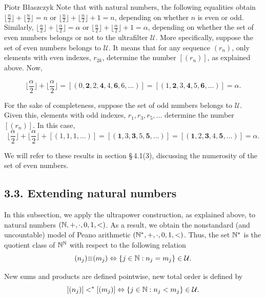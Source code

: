 \begin{artengenv}{Piotr Błaszczyk}
Note that with natural numbers, the following equalities obtain $\lfloor \frac n2 \rfloor + \lfloor \frac n2 \rfloor=n$ or
$\lfloor \frac n2 \rfloor + \lfloor \frac n2 \rfloor +1=n$,
 depending on whether $n$ is even or odd. Similarly, $\Big\lfloor \frac\alpha 2 \Big\rfloor +\Big\lfloor \frac\alpha 2 \Big\rfloor=\alpha$ or $\Big\lfloor \frac\alpha 2 \Big\rfloor +\Big\lfloor \frac\alpha 2 \Big\rfloor+1=\alpha$, depending on whether the set of even numbers belongs or not  to the ultrafilter $\mathcal U$. More specifically,
suppose the set of even numbers belongs to $\mathcal U$. It means that for any sequence $(r_n)$, only elements with 
even indexes, $r_{2k}$, determine the number $[(r_n)]$, as explained above. Now,
 
 \[\Big\lfloor \frac\alpha 2 \Big\rfloor +\Big\lfloor \frac\alpha 2 \Big\rfloor=[(0,\textbf{2},2,\textbf{4},4,\textbf{6},6,... )]=[(1,\textbf{2},3,\textbf{4},5,\textbf{6},...)]=\alpha.\]
 
  
 

For the sake of completeness, suppose the set of odd numbers belongs to $\mathcal U$. Given this, elements with odd indexes, $r_1, r_3, r_5,...$ determine the number $[(r_n)]$. In this case,
 \[\Big\lfloor \frac\alpha 2 \Big\rfloor +\Big\lfloor \frac\alpha 2 \Big\rfloor+[(1,1,1,...)]=
 [(\textbf{1},3,\textbf{3},5,\textbf{5},...)]=[(\textbf{1},2,\textbf{3},4,\textbf{5},...)]=\alpha.  \]
 
 We will refer to these results in section \S\,4.1(3), discussing the numerosity of the set of even numbers.

\subsection{3.3. Extending natural numbers}
In this subsection, we apply the ultrapower construction, as explained above, to natural numbers $({\mathbb{N}},+,\cdot,0,1,<)$. As a result, we obtain the nonstandard (and uncountable) model of Peano arithmetic $({\mathbb{N}}^*,+,\cdot,0,1,<)$. Thus, the set ${\mathbb{N}}^*$  is  the quotient class of ${\mathbb{N}}^{{\mathbb{N}}}$ with
 respect to the  following relation
\[(n_j)\mathcal \equiv (m_j) \Leftrightarrow \{j\in{\mathbb{N}}: n_j=m_j\}\in \mathcal U.\]

New sums and products are defined pointwise,
 new total order is defined by
\[[(n_j)]<^*[(m_j)]\Leftrightarrow \{j\in{\mathbb{N}}: n_j<m_j\}\in\mathcal U.\]


\end{artengenv}

